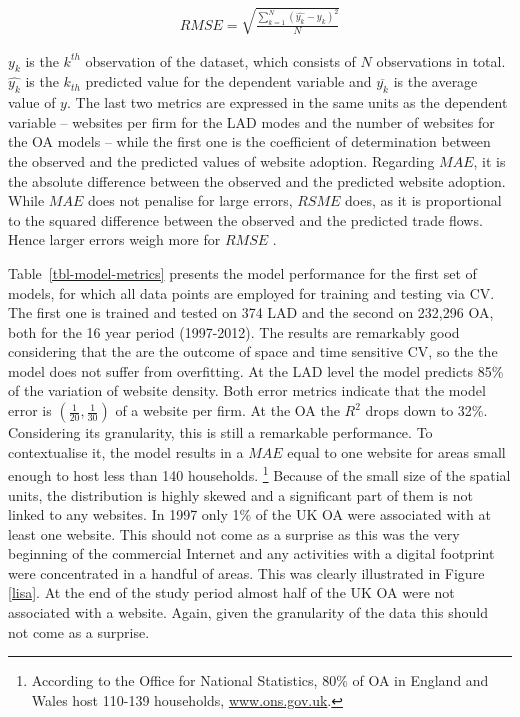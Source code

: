 \documentclass[
  authoryear,
  preprint,
  3p]{elsarticle}
\begin{document}
\begin{align}
RMSE =  \sqrt{\frac{\sum_{k = 1}^{N} (\hat{y_{k}} - y_{k})^2} {N}} \label{eq:rmse}
\end{align}

\noindent \(y_{k}\) is the \(k^{th}\) observation of the dataset, which
consists of \(N\) observations in total. \(\hat{y_{k}}\) is the
\(k_{th}\) predicted value for the dependent variable and
\(\overline{y_{k}}\) is the average value of \(y\). The last two metrics
are expressed in the same units as the dependent variable -- websites
per firm for the LAD modes and the number of websites for the OA models
-- while the first one is the coefficient of determination between the
observed and the predicted values of website adoption. Regarding
\(MAE\), it is the absolute difference between the observed and the
predicted website adoption. While \(MAE\) does not penalise for large
errors, \(RSME\) does, as it is proportional to the squared difference
between the observed and the predicted trade flows. Hence larger errors
weigh more for \(RMSE\) \citep{pontius2008components}.

Table~\ref{tbl-model-metrics} presents the model performance for the
first set of models, for which all data points are employed for training
and testing via CV. The first one is trained and tested on 374 LAD and
the second on 232,296 OA, both for the 16 year period (1997-2012). The
results are remarkably good considering that the are the outcome of
space and time sensitive CV, so the the model does not suffer from
overfitting. At the LAD level the model predicts 85\% of the variation
of website density. Both error metrics indicate that the model error is
\((\frac{1}{20}, \frac{1}{30})\) of a website per firm. At the OA the
\(R^2\) drops down to 32\%. Considering its granularity, this is still a
remarkable performance. To contextualise it, the model results in a
\(MAE\) equal to one website for areas small enough to host less than
140 households. \footnote{According to the Office for National
  Statistics, 80\% of OA in England and Wales host 110-139 households,
  \href{https://www.ons.gov.uk/census/2001censusandearlier/dataandproducts/outputgeography/outputareas}{www.ons.gov.uk}.}
Because of the small size of the spatial units, the distribution is
highly skewed and a significant part of them is not linked to any
websites. In 1997 only 1\% of the UK OA were associated with at least
one website. This should not come as a surprise as this was the very
beginning of the commercial Internet and any activities with a digital
footprint were concentrated in a handful of areas. This was clearly
illustrated in Figure \ref{lisa}. At the end of the study period almost
half of the UK OA were not associated with a website. Again, given the
granularity of the data this should not come as a surprise.
\end{document}
